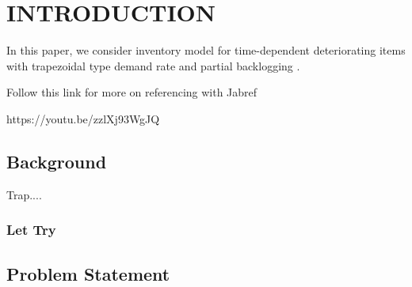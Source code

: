 \chapter{INTRODUCTION}

In this paper, we consider inventory model for time-dependent deteriorating items with trapezoidal type demand rate
and partial backlogging \citep{Fosu2021}.

\vspace{1cm}

Follow this link for more on referencing with Jabref
\begin{center}
	{https://youtu.be/zzlXj93WgJQ}
\end{center}

\section{Background} 
Trap....  

\subsection{Let Try}


\section{Problem Statement}